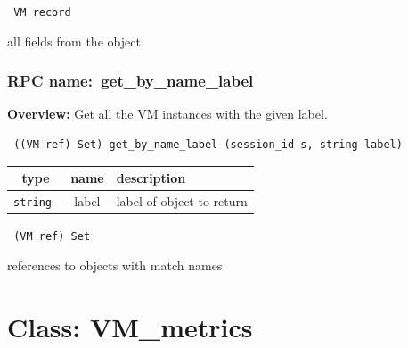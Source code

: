 \vspace{0.3cm}

{\tt 
VM record
}


all fields from the object
\vspace{0.3cm}
\vspace{0.3cm}
\vspace{0.3cm}
\subsubsection{RPC name:~get\_by\_name\_label}

{\bf Overview:} 
Get all the VM instances with the given label.

\begin{verbatim} ((VM ref) Set) get_by_name_label (session_id s, string label)\end{verbatim}



 
\vspace{0.3cm}
\begin{tabular}{|c|c|p{7cm}|}
 \hline
{\bf type} & {\bf name} & {\bf description} \\ \hline
{\tt string } & label & label of object to return \\ \hline 

\end{tabular}

\vspace{0.3cm}

{\tt 
(VM ref) Set
}


references to objects with match names
\vspace{0.3cm}
\vspace{0.3cm}
\vspace{0.3cm}

\vspace{1cm}
\newpage
\section{Class: VM\_metrics}
